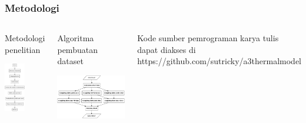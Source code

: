 \documentclass[8pt]{beamer}
\begin{document}
\begin{frame}
  \frametitle{Metodologi}
  \begin{columns}[T]
    \begin{block}{\center Metodologi penelitian}
      \begin{center}
    \includegraphics[width=0.5\textwidth]{figure/graph_metodologi.png}
      \end{center}
    \end{block}
    \begin{block}{\center Algoritma pembuatan dataset}
      \begin{center}
    \includegraphics[width=1.0\textwidth]{figure/graph_algoritma.png}
      \end{center}
    \end{block}
    Kode sumber pemrograman karya tulis dapat diakses di https://github.com/sutricky/a3thermalmodel
  \end{columns}
  

\end{frame}
\end{document}
